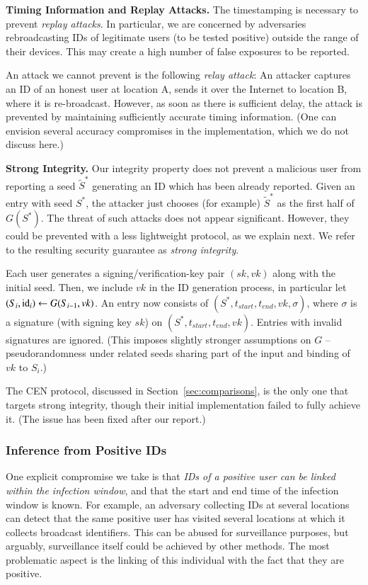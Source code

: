 {\bf Timing Information and Replay Attacks.} 
The timestamping is necessary to prevent {\em replay attacks}. In particular, we are concerned by adversaries rebroadcasting IDs of legitimate users (to be tested positive) outside the range of their devices. This may create a high number of false exposures to be reported. 

An attack we cannot prevent is the following {\em relay attack}: An attacker captures an ID of an honest user at location A, sends it over the Internet to location B, where it is re-broadcast.  However, as soon as there is sufficient delay, the attack is prevented by maintaining sufficiently accurate timing information. (One can envision several accuracy compromises in the implementation, which we do not discuss here.)

{\bf Strong Integrity.} Our integrity property does not prevent a malicious user from reporting a seed $\widetilde{S}^*$ generating an ID which has been already reported. Given an entry with seed $S^*$, the attacker just chooses (for example) $\widetilde{S}^*$ as the first half of $G(S^*)$. The threat of such attacks does not appear significant. However, they could be prevented with a less lightweight protocol, as we explain next. We refer to the resulting security guarantee as {\em strong integrity}. 

Each user generates a signing/verification-key pair $(sk, vk)$ along with the initial seed. Then, we include $vk$ in the ID generation process, in particular let $(S_i, \mathrm{id}_i) \gets G(S_{i-1}, vk)$. An entry now consists of $(S^*, t_{start}, t_{end}, vk, \sigma)$, where $\sigma$ is a signature (with signing key $sk$) on $(S^*, t_{start}, t_{end}, vk)$. Entries with invalid signatures are ignored. (This imposes slightly stronger assumptions on $G$ -- pseudorandomness under related seeds sharing part of the input and binding of $vk$ to $S_i$.)

The CEN protocol, discussed in Section~\ref{sec:comparisons}, is the only one that targets strong integrity, though their initial implementation failed to fully achieve it. (The issue has been fixed after our report.)

\subsubsection{Inference from Positive IDs} 

One explicit compromise we take is that {\em IDs of a positive user can be linked within the infection window}, and that the start and end time of the infection window is known. For example, an adversary collecting IDs at several locations can detect that the same positive user has visited several locations at which it collects broadcast identifiers. This can be abused for surveillance purposes, but arguably, surveillance itself could be achieved by other methods. The most problematic aspect is the linking of this individual with the fact that they are positive. 

